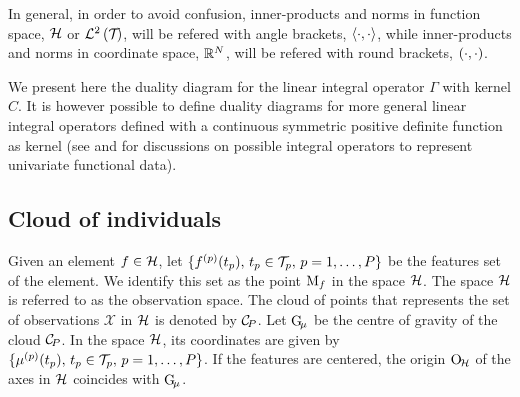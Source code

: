 \begin{remark}
   In general, in order to avoid confusion, inner-products and norms in function space, $\mathcal{H}$ or $\mathcal{L}^{2}\left(\mathcal{T}_{}\right)$, will be refered with angle brackets, $\left\langle\cdot, \cdot\right\rangle$, while inner-products and norms in coordinate space, $\mathbb{R}^N$,  will be refered with round brackets, $\left(\cdot, \cdot\right)$.
\end{remark}

\begin{remark}\label{rem:rhks}
We present here the duality diagram for the linear integral operator $\Gamma$ with kernel $C$. It is however possible to define duality diagrams for more general linear integral operators defined with a continuous symmetric positive definite function as kernel (see \cite{gonzalezRepresentingFunctionalData2010} and \cite{wongNonparametricOperatorregularizedCovariance2019a} for discussions on possible integral operators to represent univariate functional data).
\end{remark}

\subsection{Cloud of individuals} %
\label{sub:cloud_of_individuals}

Given an element $f \in \mathcal{H}$, let $\{f^{(p)}(t_p),\,t_p \in \mathcal{T}_{p},\,p = 1, \dots, P\}$ be the features set of the element. We identify this set as the point $\mathrm{M}_f$ in the space $\mathcal{H}$. The space $\mathcal{H}$ is referred to as the observation space. The cloud of points that represents the set of observations $\mathcal{X}$ in $\mathcal{H}$ is denoted by $\mathcal{C}_{\!P}$. Let $\mathrm{G}_{\!\mu}$ be the centre of gravity of the cloud $\mathcal{C}_{\!P}$. In the space $\mathcal{H}$, its coordinates are given by $\{\mu^{(p)}(t_p),\,t_p \in \mathcal{T}_{p},\,p = 1, \dots, P\}$. If the features are centered, the origin $\mathrm{O}_{\!\mathcal{H}}$ of the axes in $\mathcal{H}$ coincides with $\mathrm{G}_{\!\mu}$.

